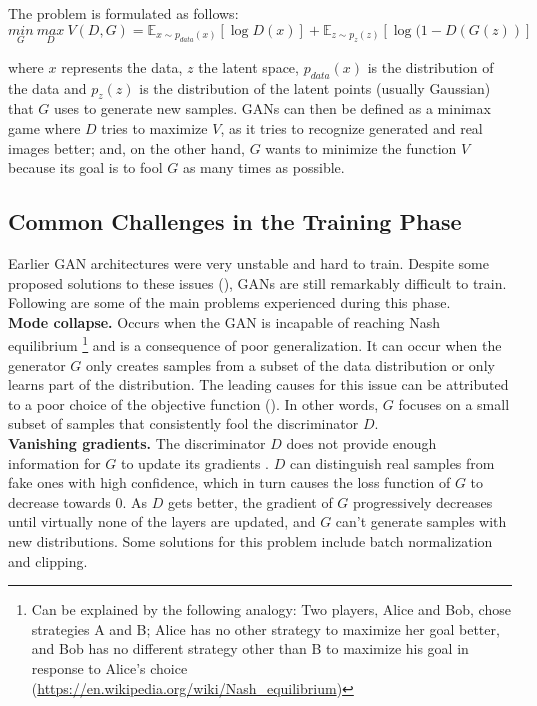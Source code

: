 The problem is formulated as follows:
\begin{equation}
    \underset{G}{min}\ \underset{D}{max}\ V(D,G) = \mathbb{E}_{x \sim p_{data}(x)}[\log D(x)] + \mathbb{E}_{z \sim p_z(z)}[\log(1 - D(G(z))]
    \label{eq:gan_min_max}
 \end{equation}

 \noindent where $x$ represents the data, $z$ the latent space,  $p_{data}(x)$ is the distribution of the data and $p_z(z)$ is the distribution of the latent points (usually Gaussian) that $G$ uses to generate new samples. GANs can then be defined as a minimax game where $D$ tries to maximize $V$, as it tries to recognize generated and real images better; and, on the other hand, $G$ wants to minimize the function $V$ because its goal is to fool $G$ as many times as possible. 


\subsection{Common Challenges in the Training Phase}
Earlier GAN architectures were very unstable and hard to train. Despite some proposed solutions to these issues (\cite{radford.etal_UnsupervisedRepresentationLearning_2016,arjovsky.etal_WassersteinGenerativeAdversarial_}), GANs are still remarkably difficult to train. Following are some of the main problems experienced during this phase.\\

\noindent\textbf{Mode collapse.} Occurs when the GAN is incapable of reaching Nash equilibrium \footnote{Can be explained by the following analogy: Two players, Alice and Bob, chose strategies A and B; Alice has no other strategy to maximize her goal better, and Bob has no different strategy other than B to maximize his goal in response to Alice's choice (\url{https://en.wikipedia.org/wiki/Nash_equilibrium})} and is a consequence of poor generalization. It can occur when the generator $G$ only creates samples from a subset of the data distribution or only learns part of the distribution. The leading causes for this issue can be attributed to a poor choice of the objective function (\cite{saxena.cao_GenerativeAdversarialNetworks_2022}). In other words, $G$ focuses on a small subset of samples that consistently fool the discriminator $D$.\\

\noindent\textbf{Vanishing gradients.} The discriminator $D$ does not provide enough information for $G$ to update its gradients \cite{little.etal_GenerativeAdversarialNetworks_2021}. $D$ can distinguish real samples from fake ones with high confidence, which in turn causes the loss function of $G$ to decrease towards 0. As $D$ gets better, the gradient of $G$ progressively decreases until virtually none of the layers are updated, and $G$ can't generate samples with new distributions. Some solutions for this problem include batch normalization and clipping.\\

